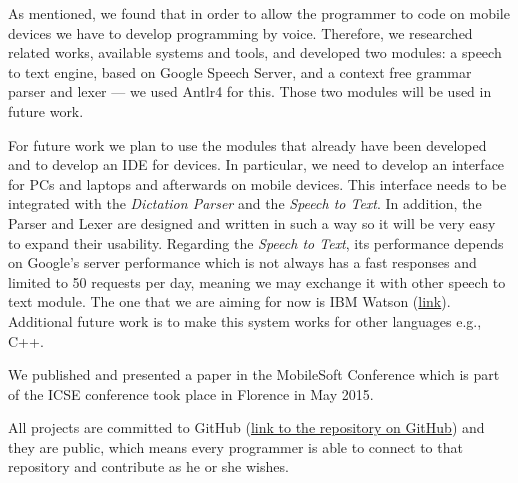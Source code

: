 As mentioned, we found that in order to allow the programmer to code on mobile devices we have to develop programming by voice. Therefore, we researched related works, available systems and tools, and developed two modules: a speech to text engine, based on Google Speech Server, and a context free grammar parser and lexer --- we used Antlr4 for this. Those two modules will be used in future work.

For future work we plan to use the modules that already have been developed and to develop an IDE for devices. In particular, we need to develop an interface for PCs and laptops and afterwards on mobile devices. This interface needs to be integrated with the \textit{Dictation Parser} and the \textit{Speech to Text}. In addition, the Parser and Lexer are designed and written in such a way so it will be very easy to expand their usability. Regarding the \textit{Speech to Text}, its performance depends on Google's server performance which is not always has a fast responses and limited to 50 requests per day, meaning we may exchange it with other speech to text module. The one that we are aiming for now is IBM Watson (\href{https://www.ibm.com/smarterplanet/us/en/ibmwatson/developercloud/}{link}). Additional future work is to make this system works for other languages e.g., C++.

We published and presented a paper in the MobileSoft Conference which is part of the ICSE conference took place in Florence in May 2015.

All projects are committed to GitHub (\href{https://github.com/shaolinrabbi/DeveryWhere.git}{link to the repository on GitHub}) and they are public, which means every programmer is able to connect to that repository and contribute as he or she wishes.